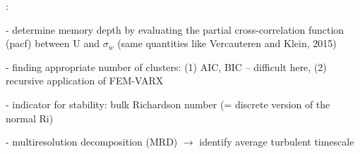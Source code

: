 \documentclass[11pt]{article}
\begin{document}
\citet{BoykoDiss2022}:
\begin{compactenum}
	\item[-] determine memory depth by evaluating the partial cross-correlation function (pacf) between U and $\sigma_w$ (same quantities like Vercauteren and Klein, 2015)
	\item[-] finding appropriate number of clusters: (1) AIC, BIC -- difficult here, (2) recursive application of FEM-VARX
	\item[-] indicator for stability: bulk Richardson number (= discrete version of the normal Ri)
	\item[-] multiresolution decomposition (MRD) $\rightarrow$ identify average turbulent timescale \\
\end{compactenum}

	
	
\end{document}
